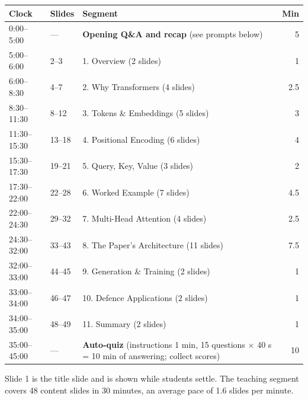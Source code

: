 \documentclass[11pt]{article}
\begin{document}
\begin{center}\small\renewcommand{\arraystretch}{1.2}\begin{tabularx}{\textwidth}{@{}l l X r@{}}\toprule\textbf{Clock} & \textbf{Slides} & \textbf{Segment} & \textbf{Min}\\\midrule

0:00--5:00 & --- & \textbf{Opening Q\&A and recap} (see prompts below) & 5\\

5:00--6:00 & 2--3 & 1. Overview (2 slides) & 1\\

6:00--8:30 & 4--7 & 2. Why Transformers (4 slides) & 2.5\\

8:30--11:30 & 8--12 & 3. Tokens \& Embeddings (5 slides) & 3\\

11:30--15:30 & 13--18 & 4. Positional Encoding (6 slides) & 4\\

15:30--17:30 & 19--21 & 5. Query, Key, Value (3 slides) & 2\\

17:30--22:00 & 22--28 & 6. Worked Example (7 slides) & 4.5\\

22:00--24:30 & 29--32 & 7. Multi-Head Attention (4 slides) & 2.5\\

24:30--32:00 & 33--43 & 8. The Paper's Architecture (11 slides) & 7.5\\

32:00--33:00 & 44--45 & 9. Generation \& Training (2 slides) & 1\\

33:00--34:00 & 46--47 & 10. Defence Applications (2 slides) & 1\\

34:00--35:00 & 48--49 & 11. Summary (2 slides) & 1\\

35:00--45:00 & --- & \textbf{Auto-quiz} (instructions 1 min, 15 questions $\times$ 40 s = 10 min of answering; collect scores) & 10\\\bottomrule\end{tabularx}\end{center}

Slide 1 is the title slide and is shown while students settle. The teaching segment covers 48 content slides in 30 minutes, an average pace of 1.6 slides per minute. 
\end{document}
